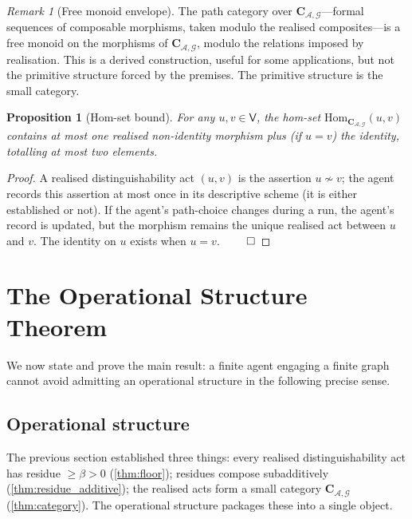 \documentclass[11pt,a4paper]{article}
\theoremstyle{thmstyle}
\newtheorem{proposition}[theorem]{Proposition}
\theoremstyle{definition}
\theoremstyle{remark}
\newtheorem{remark}[theorem]{Remark}
\newcommand{\Graph}{\mathcal{G}}
\newcommand{\Vrt}{\mathsf{V}}
\newcommand{\Agent}{\mathcal{A}}
\newcommand{\floor}{\beta}
\begin{document}
\begin{remark}[Free monoid envelope]
\label{rem:free_monoid}
The path category over $\mathbf{C}_{\Agent,\Graph}$---formal
sequences of composable morphisms, taken modulo the realised
composites---is a free monoid on the morphisms of
$\mathbf{C}_{\Agent,\Graph}$, modulo the relations imposed by
realisation. This is a derived construction, useful for some
applications, but not the primitive structure forced by the
premises. The primitive structure is the small category.
\end{remark}


\begin{proposition}[Hom-set bound]
\label{prop:hom_bound}
For any $u, v \in \Vrt$, the hom-set
$\mathrm{Hom}_{\mathbf{C}_{\Agent,\Graph}}(u, v)$ contains at most
one realised non-identity morphism plus (if $u = v$) the identity,
totalling at most two elements.
\end{proposition}

\begin{proof}
A realised distinguishability act $(u, v)$ is the assertion
$u \not\sim v$; the agent records this assertion at most once in
its descriptive scheme (it is either established or not). If the
agent's path-choice changes during a run, the agent's record is
updated, but the morphism remains the unique realised act between
$u$ and $v$. The identity on $u$ exists when $u = v$. $\qed$
\end{proof}

\section{The Operational Structure Theorem}
\label{sec:main}

We now state and prove the main result: a finite agent engaging a
finite graph cannot avoid admitting an operational structure in the
following precise sense.

\subsection{Operational structure}

The previous section established three things: every realised
distinguishability act has residue $\geq \floor > 0$
(\cref{thm:floor}); residues compose subadditively
(\cref{thm:residue_additive}); the realised acts form a small
category $\mathbf{C}_{\Agent,\Graph}$ (\cref{thm:category}). The
operational structure packages these into a single object.
\end{document}
